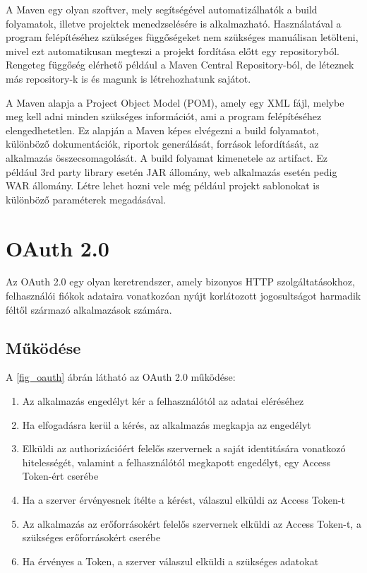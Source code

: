 A Maven egy olyan szoftver, mely segítségével automatizálhatók a build folyamatok, illetve projektek menedzselésére is alkalmazható.\cite{maven1, maven2}
Használatával a program felépítéséhez szükséges függőségeket nem szükséges manuálisan letölteni, mivel ezt automatikusan megteszi a projekt fordítása előtt egy repositoryból.
Rengeteg függőség elérhető például a Maven Central Repository-ból, de léteznek más repository-k is és magunk is létrehozhatunk sajátot. 

A Maven alapja a Project Object Model (POM), amely egy XML fájl, melybe meg kell adni minden szükséges információt, ami a program felépítéséhez elengedhetetlen.
Ez alapján a Maven képes elvégezni a build folyamatot, különböző dokumentációk, riportok generálását, források lefordítását, az alkalmazás összecsomagolását.
A build folyamat kimenetele az artifact.
Ez például 3rd party library esetén JAR állomány, web alkalmazás esetén pedig WAR állomány.
Létre lehet hozni vele még például projekt sablonokat is különböző paraméterek megadásával. 


\section{OAuth 2.0}

Az OAuth 2.0 egy olyan keretrendszer, amely bizonyos HTTP szolgáltatásokhoz, felhasználói fiókok adataira vonatkozóan nyújt korlátozott jogosultságot harmadik féltől származó alkalmazások számára.\cite{oauth}

\subsection*{Működése} 

A \ref{fig_oauth} ábrán látható az OAuth 2.0 működése: 



\begin{enumerate}
\item Az alkalmazás engedélyt kér a felhasználótól az adatai eléréséhez 
\item Ha elfogadásra kerül a kérés, az alkalmazás megkapja az engedélyt 
\item Elküldi az authorizációért felelős szervernek a saját identitására vonatkozó hitelességét, valamint a felhasználótól megkapott engedélyt, egy Access Token-ért cserébe 
\item Ha a szerver érvényesnek ítélte a kérést, válaszul elküldi az Access Token-t 
\item Az alkalmazás az erőforrásokért felelős szervernek elküldi az Access Token-t, a szükséges erőforrásokért cserébe 
\item Ha érvényes a Token, a szerver válaszul elküldi a szükséges adatokat 
\end{enumerate}


